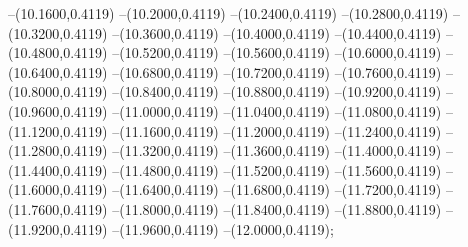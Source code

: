 {	--(10.1600,0.4119)
	--(10.2000,0.4119)
	--(10.2400,0.4119)
	--(10.2800,0.4119)
	--(10.3200,0.4119)
	--(10.3600,0.4119)
	--(10.4000,0.4119)
	--(10.4400,0.4119)
	--(10.4800,0.4119)
	--(10.5200,0.4119)
	--(10.5600,0.4119)
	--(10.6000,0.4119)
	--(10.6400,0.4119)
	--(10.6800,0.4119)
	--(10.7200,0.4119)
	--(10.7600,0.4119)
	--(10.8000,0.4119)
	--(10.8400,0.4119)
	--(10.8800,0.4119)
	--(10.9200,0.4119)
	--(10.9600,0.4119)
	--(11.0000,0.4119)
	--(11.0400,0.4119)
	--(11.0800,0.4119)
	--(11.1200,0.4119)
	--(11.1600,0.4119)
	--(11.2000,0.4119)
	--(11.2400,0.4119)
	--(11.2800,0.4119)
	--(11.3200,0.4119)
	--(11.3600,0.4119)
	--(11.4000,0.4119)
	--(11.4400,0.4119)
	--(11.4800,0.4119)
	--(11.5200,0.4119)
	--(11.5600,0.4119)
	--(11.6000,0.4119)
	--(11.6400,0.4119)
	--(11.6800,0.4119)
	--(11.7200,0.4119)
	--(11.7600,0.4119)
	--(11.8000,0.4119)
	--(11.8400,0.4119)
	--(11.8800,0.4119)
	--(11.9200,0.4119)
	--(11.9600,0.4119)
	--(12.0000,0.4119);
}
